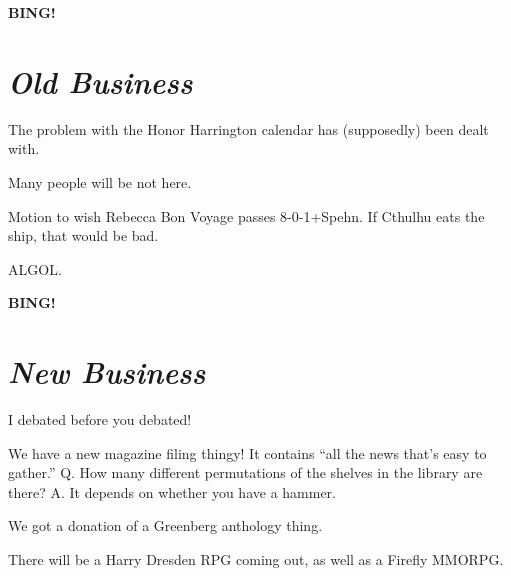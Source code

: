 \documentclass[10pt]{article}
\newcommand{\bing}{{\bf BING!} }
\newcommand{\goto}[1]{\bing \vskip 12pt \section*{{\em{#1}}}}
\begin{document}







\goto{Old Business}

The problem with the Honor Harrington calendar has (supposedly) been dealt with.

Many people will be not here.

Motion to wish Rebecca Bon Voyage passes 8-0-1+Spehn. If Cthulhu eats the ship, that would be bad.

ALGOL.

\goto{New Business}

I debated before you debated!

We have a new magazine filing thingy! It contains ``all the news that's easy to gather.'' Q. How many different permutations of the shelves in the library are there? A. It depends on whether you have a hammer.

We got a donation of a Greenberg anthology thing.

There will be a Harry Dresden RPG coming out, as well as a Firefly MMORPG.
\end{document}
